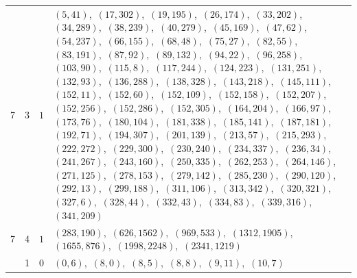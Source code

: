 \documentclass[11pt]{article}
\begin{document}
\begin{longtable}{@{}rrl>{\raggedright\arraybackslash}p{}@{}}
7 & 3 & $1$ & $(5,41)$,\allowbreak\ $(17,302)$,\allowbreak\ $(19,195)$,\allowbreak\ $(26,174)$,\allowbreak\ $(33,202)$,\allowbreak\ $(34,289)$,\allowbreak\ $(38,239)$,\allowbreak\ $(40,279)$,\allowbreak\ $(45,169)$,\allowbreak\ $(47,62)$,\allowbreak\ $(54,237)$,\allowbreak\ $(66,155)$,\allowbreak\ $(68,48)$,\allowbreak\ $(75,27)$,\allowbreak\ $(82,55)$,\allowbreak\ $(83,191)$,\allowbreak\ $(87,92)$,\allowbreak\ $(89,132)$,\allowbreak\ $(94,22)$,\allowbreak\ $(96,258)$,\allowbreak\ $(103,90)$,\allowbreak\ $(115,8)$,\allowbreak\ $(117,244)$,\allowbreak\ $(124,223)$,\allowbreak\ $(131,251)$,\allowbreak\ $(132,93)$,\allowbreak\ $(136,288)$,\allowbreak\ $(138,328)$,\allowbreak\ $(143,218)$,\allowbreak\ $(145,111)$,\allowbreak\ $(152,11)$,\allowbreak\ $(152,60)$,\allowbreak\ $(152,109)$,\allowbreak\ $(152,158)$,\allowbreak\ $(152,207)$,\allowbreak\ $(152,256)$,\allowbreak\ $(152,286)$,\allowbreak\ $(152,305)$,\allowbreak\ $(164,204)$,\allowbreak\ $(166,97)$,\allowbreak\ $(173,76)$,\allowbreak\ $(180,104)$,\allowbreak\ $(181,338)$,\allowbreak\ $(185,141)$,\allowbreak\ $(187,181)$,\allowbreak\ $(192,71)$,\allowbreak\ $(194,307)$,\allowbreak\ $(201,139)$,\allowbreak\ $(213,57)$,\allowbreak\ $(215,293)$,\allowbreak\ $(222,272)$,\allowbreak\ $(229,300)$,\allowbreak\ $(230,240)$,\allowbreak\ $(234,337)$,\allowbreak\ $(236,34)$,\allowbreak\ $(241,267)$,\allowbreak\ $(243,160)$,\allowbreak\ $(250,335)$,\allowbreak\ $(262,253)$,\allowbreak\ $(264,146)$,\allowbreak\ $(271,125)$,\allowbreak\ $(278,153)$,\allowbreak\ $(279,142)$,\allowbreak\ $(285,230)$,\allowbreak\ $(290,120)$,\allowbreak\ $(292,13)$,\allowbreak\ $(299,188)$,\allowbreak\ $(311,106)$,\allowbreak\ $(313,342)$,\allowbreak\ $(320,321)$,\allowbreak\ $(327,6)$,\allowbreak\ $(328,44)$,\allowbreak\ $(332,43)$,\allowbreak\ $(334,83)$,\allowbreak\ $(339,316)$,\allowbreak\ $(341,209)$\\
7 & 4 & $1$ & $(283,190)$,\allowbreak\ $(626,1562)$,\allowbreak\ $(969,533)$,\allowbreak\ $(1312,1905)$,\allowbreak\ $(1655,876)$,\allowbreak\ $(1998,2248)$,\allowbreak\ $(2341,1219)$\\
\addlinespace[3pt]
13 & 1 & $0$ & $(0,6)$,\allowbreak\ $(8,0)$,\allowbreak\ $(8,5)$,\allowbreak\ $(8,8)$,\allowbreak\ $(9,11)$,\allowbreak\ $(10,7)$\\

\end{longtable}
\end{document}
